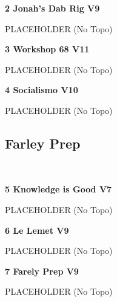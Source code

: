 \begin{multicols}{2}
					\begin{minipage}{\linewidth}	
					\label{rt:Jonah's Dab Rig}\colorbox{Goldenrod!50}{\textbf{2 Jonah's Dab Rig V9  }}
					\begin{adjustwidth}{0.5cm}{}				
					PLACEHOLDER
						\newline (No Topo) 
					\end{adjustwidth}
					\end{minipage}
					\begin{minipage}{\linewidth}	
					\label{rt:Workshop 68}\colorbox{red!20}{\textbf{3 Workshop 68 V11  }}
					\begin{adjustwidth}{0.5cm}{}				
					PLACEHOLDER
						\newline (No Topo) 
					\end{adjustwidth}
					\end{minipage}
					\begin{minipage}{\linewidth}	
					\label{rt:Socialismo}\colorbox{red!20}{\textbf{4 Socialismo V10  }}
					\begin{adjustwidth}{0.5cm}{}				
					PLACEHOLDER
						\newline (No Topo) 
					\end{adjustwidth}
					\end{minipage}
			\subsection*{Farley Prep}\label{bf:Farley Prep}
			\begin{minipage}{\columnwidth}
			\
			\end{minipage}
			
					\begin{minipage}{\linewidth}	
					\label{rt:Knowledge is Good}\colorbox{Goldenrod!50}{\textbf{5 Knowledge is Good V7  }}
					\begin{adjustwidth}{0.5cm}{}				
					PLACEHOLDER
						\newline (No Topo) 
					\end{adjustwidth}
					\end{minipage}
					\begin{minipage}{\linewidth}	
					\label{rt:Le Lemet}\colorbox{Goldenrod!50}{\textbf{6 Le Lemet V9  }}
					\begin{adjustwidth}{0.5cm}{}				
					PLACEHOLDER
						\newline (No Topo) 
					\end{adjustwidth}
					\end{minipage}
					\begin{minipage}{\linewidth}	
					\label{rt:Farely Prep}\colorbox{Goldenrod!50}{\textbf{7 Farely Prep V9  }}
					\begin{adjustwidth}{0.5cm}{}				
					PLACEHOLDER
						\newline (No Topo) 
					\end{adjustwidth}
					\end{minipage}
\end{multicols}
\clearpage